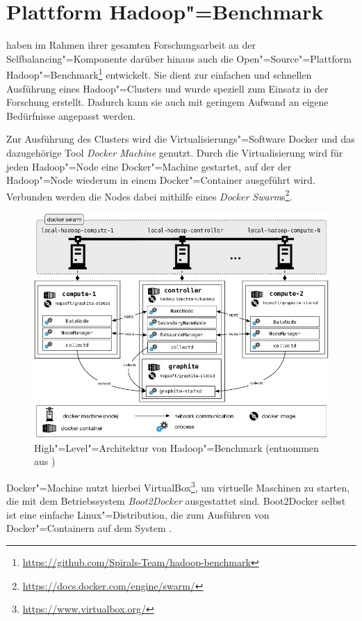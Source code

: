 \section{Plattform Hadoop"=Benchmark}
\label{sec:hadoopBenchmark}

\citeauthor{Zhang2016} haben im Rahmen ihrer gesamten Forschungsarbeit an der Selfbalancing"=Komponente darüber hinaus auch die Open"=Source"=Plattform Hadoop"=Benchmark\footnote{\url{https://github.com/Spirals-Team/hadoop-benchmark}} entwickelt.
Sie dient zur einfachen und schnellen Ausführung eines Hadoop"=Clusters und wurde speziell zum Einsatz in der Forschung erstellt.
Dadurch kann sie auch mit geringem Aufwand an eigene Bedürfnisse angepasst werden.

Zur Ausführung des Clusters wird die Virtualisierungs"=Software Docker und das dazugehörige Tool \emph{Docker Machine} genutzt.
Durch die Virtualisierung wird für jeden Hadoop"=Node eine Docker"=Machine gestartet, auf der der Hadoop"=Node wiederum in einem Docker"=Container ausgeführt wird.
Verbunden werden die Nodes dabei mithilfe eines \emph{Docker  Swarm}s\footnote{\url{https://docs.docker.com/engine/swarm/}}.

\begin{figure}[h]
    \includegraphics{./resources/hadoopBenchmarkArch.png}
    \caption[High"=Level"=Architektur von Hadoop"=Benchmark]
    {High"=Level"=Architektur von Hadoop"=Benchmark (entnommen aus \cite{abb:hadoopBenchmarkArch})}
    \label{fig:hadoopBenchmarkArchitecture}
\end{figure}

Docker"=Machine nutzt hierbei VirtualBox\footnote{\url{https://www.virtualbox.org/}}, um virtuelle Maschinen zu starten, die mit dem Betriebssystem \emph{Boot2Docker} ausgestattet sind.
Boot2Docker selbst ist eine einfache Linux"=Distribution, die zum Ausführen von Docker"=Containern auf dem System \cite{DockerMachineGettingStartedVm}.

